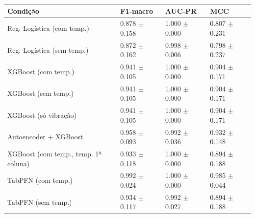 \begin{tabular}{llll}
\toprule
Condição & F1-macro & AUC-PR & MCC \\
\midrule
Reg. Logística (com temp.) & 0.878 $\pm$ 0.158 & 1.000 $\pm$ 0.000 & 0.807 $\pm$ 0.231 \\
Reg. Logística (sem temp.) & 0.872 $\pm$ 0.162 & 0.998 $\pm$ 0.006 & 0.798 $\pm$ 0.237 \\
XGBoost (com temp.) & 0.941 $\pm$ 0.105 & 1.000 $\pm$ 0.000 & 0.904 $\pm$ 0.171 \\
XGBoost (sem temp.) & 0.941 $\pm$ 0.105 & 1.000 $\pm$ 0.000 & 0.904 $\pm$ 0.171 \\
XGBoost (só vibração) & 0.941 $\pm$ 0.105 & 1.000 $\pm$ 0.000 & 0.904 $\pm$ 0.171 \\
Autoencoder + XGBoost & 0.958 $\pm$ 0.093 & 0.992 $\pm$ 0.036 & 0.932 $\pm$ 0.148 \\
XGBoost (com temp., temp. 1ª coluna) & 0.933 $\pm$ 0.118 & 1.000 $\pm$ 0.000 & 0.894 $\pm$ 0.188 \\
TabPFN (com temp.) & 0.992 $\pm$ 0.024 & 1.000 $\pm$ 0.000 & 0.985 $\pm$ 0.044 \\
TabPFN (sem temp.) & 0.934 $\pm$ 0.117 & 0.992 $\pm$ 0.027 & 0.894 $\pm$ 0.188 \\
\bottomrule
\end{tabular}
